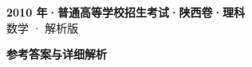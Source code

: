 \documentclass[zihao=-4, a4paper]{ctexart}
\begin{document}
\begin{center}
  {\Large\bfseries 2010 年·普通高等学校招生考试·陕西卷·理科}\\[4pt]
  {\large 数学 · 解析版}
\end{center}
\medskip
{}

\clearpage
{}
\begin{center}{\Large\bfseries 参考答案与详细解析}\end{center}
\medskip

\end{document}
